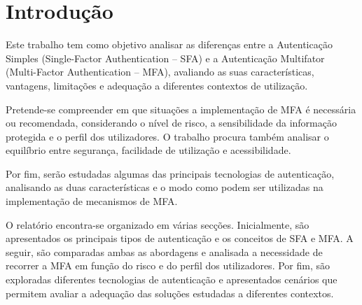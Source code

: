 \section{Introdução}

\hspace{1cm} Este trabalho tem como objetivo analisar as diferenças entre a Autenticação Simples (Single-Factor Authentication -- SFA) e a Autenticação Multifator (Multi-Factor Authentication -- MFA), avaliando as suas características, vantagens, limitações e adequação a diferentes contextos de utilização.

\hspace{1cm} Pretende-se compreender em que situações a implementação de MFA é necessária ou recomendada, considerando o nível de risco, a sensibilidade da informação protegida e o perfil dos utilizadores. O trabalho procura também analisar o equilíbrio entre segurança, facilidade de utilização e acessibilidade.

\hspace{1cm} Por fim, serão estudadas algumas das principais tecnologias de autenticação, analisando as duas características e o modo como podem ser utilizadas na implementação de mecanismos de MFA.

\hspace{1cm} O relatório encontra-se organizado em várias secções. Inicialmente, são apresentados os principais tipos de autenticação e os conceitos de SFA e MFA. A seguir, são comparadas ambas as abordagens e analisada a necessidade de recorrer a MFA em função do risco e do perfil dos utilizadores. Por fim, são exploradas diferentes tecnologias de autenticação e apresentados cenários que permitem avaliar a adequação das soluções estudadas a diferentes contextos. 